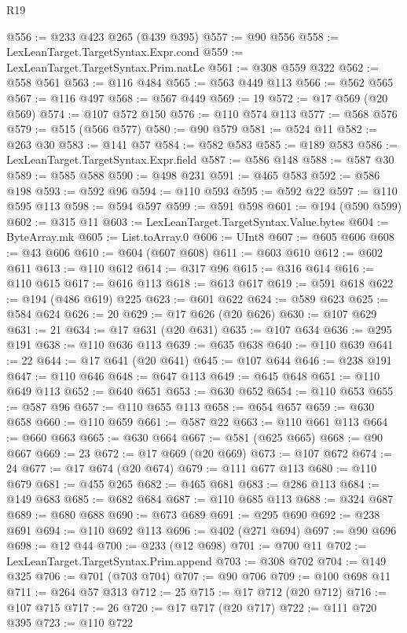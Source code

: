 \begin{lexlean}{R19}
\begin{coremodule}
@556 := @233 @423 @265 (@439 @395)
@557 := @90 @556
@558 := LexLeanTarget.TargetSyntax.Expr.cond
@559 := LexLeanTarget.TargetSyntax.Prim.natLe
@561 := @308 @559 @322
@562 := @558 @561
@563 := @116 @484
@565 := @563 @449 @113
@566 := @562 @565
@567 := @116 @497
@568 := @567 @449
@569 := 19
@572 := @17 @569 (@20 @569)
@574 := @107 @572 @150
@576 := @110 @574 @113
@577 := @568 @576
@579 := @515 (@566 @577)
@580 := @90 @579
@581 := @524 @11
@582 := @263 @30
@583 := @141 @57
@584 := @582 @583
@585 := @189 @583
@586 := LexLeanTarget.TargetSyntax.Expr.field
@587 := @586 @148
@588 := @587 @30
@589 := @585 @588
@590 := @498 @231
@591 := @465 @583
@592 := @586 @198
@593 := @592 @96
@594 := @110 @593
@595 := @592 @22
@597 := @110 @595 @113
@598 := @594 @597
@599 := @591 @598
@601 := @194 (@590 @599)
@602 := @315 @11
@603 := LexLeanTarget.TargetSyntax.Value.bytes
@604 := ByteArray.mk
@605 := List.toArray.{0}
@606 := UInt8
@607 := @605 @606
@608 := @43 @606
@610 := @604 (@607 @608)
@611 := @603 @610
@612 := @602 @611
@613 := @110 @612
@614 := @317 @96
@615 := @316 @614
@616 := @110 @615
@617 := @616 @113
@618 := @613 @617
@619 := @591 @618
@622 := @194 (@486 @619) @225
@623 := @601 @622
@624 := @589 @623
@625 := @584 @624
@626 := 20
@629 := @17 @626 (@20 @626)
@630 := @107 @629
@631 := 21
@634 := @17 @631 (@20 @631)
@635 := @107 @634
@636 := @295 @191
@638 := @110 @636 @113
@639 := @635 @638
@640 := @110 @639
@641 := 22
@644 := @17 @641 (@20 @641)
@645 := @107 @644
@646 := @238 @191
@647 := @110 @646
@648 := @647 @113
@649 := @645 @648
@651 := @110 @649 @113
@652 := @640 @651
@653 := @630 @652
@654 := @110 @653
@655 := @587 @96
@657 := @110 @655 @113
@658 := @654 @657
@659 := @630 @658
@660 := @110 @659
@661 := @587 @22
@663 := @110 @661 @113
@664 := @660 @663
@665 := @630 @664
@667 := @581 (@625 @665)
@668 := @90 @667
@669 := 23
@672 := @17 @669 (@20 @669)
@673 := @107 @672
@674 := 24
@677 := @17 @674 (@20 @674)
@679 := @111 @677 @113
@680 := @110 @679
@681 := @455 @265
@682 := @465 @681
@683 := @286 @113
@684 := @149 @683
@685 := @682 @684
@687 := @110 @685 @113
@688 := @324 @687
@689 := @680 @688
@690 := @673 @689
@691 := @295 @690
@692 := @238 @691
@694 := @110 @692 @113
@696 := @402 (@271 @694)
@697 := @90 @696
@698 := @12 @44
@700 := @233 (@12 @698)
@701 := @700 @11
@702 := LexLeanTarget.TargetSyntax.Prim.append
@703 := @308 @702
@704 := @149 @325
@706 := @701 (@703 @704)
@707 := @90 @706
@709 := @100 @698 @11
@711 := @264 @57 @313
@712 := 25
@715 := @17 @712 (@20 @712)
@716 := @107 @715
@717 := 26
@720 := @17 @717 (@20 @717)
@722 := @111 @720 @395
@723 := @110 @722

\end{coremodule}
\end{lexlean}
